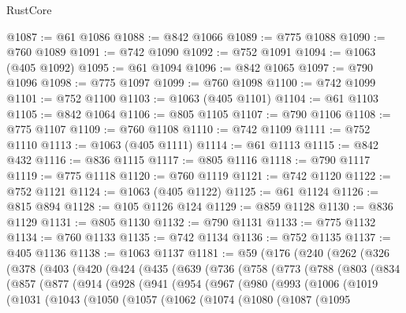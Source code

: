 \begin{lexlean}{RustCore}
\begin{coremodule}
@1087 := @61 @1086
@1088 := @842 @1066
@1089 := @775 @1088
@1090 := @760 @1089
@1091 := @742 @1090
@1092 := @752 @1091
@1094 := @1063 (@405 @1092)
@1095 := @61 @1094
@1096 := @842 @1065
@1097 := @790 @1096
@1098 := @775 @1097
@1099 := @760 @1098
@1100 := @742 @1099
@1101 := @752 @1100
@1103 := @1063 (@405 @1101)
@1104 := @61 @1103
@1105 := @842 @1064
@1106 := @805 @1105
@1107 := @790 @1106
@1108 := @775 @1107
@1109 := @760 @1108
@1110 := @742 @1109
@1111 := @752 @1110
@1113 := @1063 (@405 @1111)
@1114 := @61 @1113
@1115 := @842 @432
@1116 := @836 @1115
@1117 := @805 @1116
@1118 := @790 @1117
@1119 := @775 @1118
@1120 := @760 @1119
@1121 := @742 @1120
@1122 := @752 @1121
@1124 := @1063 (@405 @1122)
@1125 := @61 @1124
@1126 := @815 @894
@1128 := @105 @1126 @124
@1129 := @859 @1128
@1130 := @836 @1129
@1131 := @805 @1130
@1132 := @790 @1131
@1133 := @775 @1132
@1134 := @760 @1133
@1135 := @742 @1134
@1136 := @752 @1135
@1137 := @405 @1136
@1138 := @1063 @1137
@1181 := @59
    (@176
      (@240
        (@262
          (@326
            (@378
              (@403
                (@420
                  (@424
                    (@435
                      (@639
                        (@736
                          (@758
                            (@773
                              (@788
                                (@803
                                  (@834
                                    (@857
                                      (@877
                                        (@914
                                          (@928
                                            (@941
                                              (@954
                                                (@967
                                                  (@980
                                                    (@993
                                                      (@1006
                                                        (@1019
                                                          (@1031
                                                            (@1043
                                                              (@1050
                                                                (@1057
                                                                  (@1062
                                                                    (@1074
                                                                      (@1080
                                                                        (@1087
                                                                          (@1095

\end{coremodule}
\end{lexlean}
